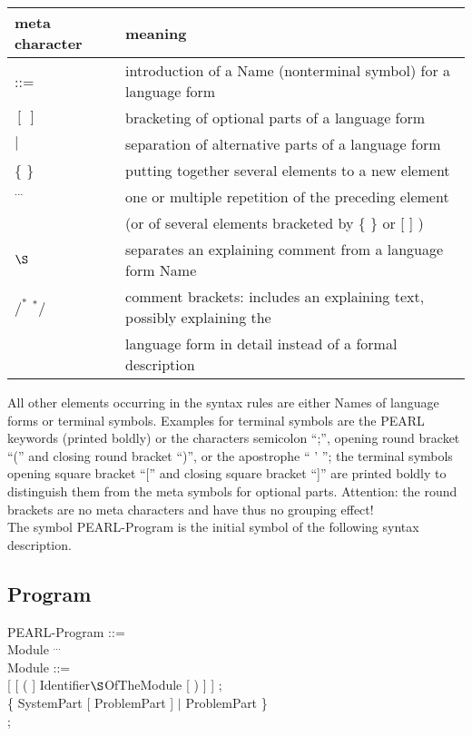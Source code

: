\begin{tabular}{ll}
meta character & meaning \\ \hline
::=            & introduction of a Name (nonterminal symbol) for a language form\\
$[\ ]$         & bracketing of optional parts of a language form \\ 
$\mid$         & separation of alternative parts of a language form\\
\{ \}          & putting together several elements to a new element\\
$^{...}$       & one or multiple repetition of the preceding element\\
               & (or of several elements bracketed by \{ \} or [ ] ) \\
$\S $          & separates an explaining comment from a language form Name\\
$/^*$ $^*/$    & comment brackets: 
                 includes an explaining text, possibly explaining the\\
               & language form in detail instead of a formal description\\
\end{tabular}

All other elements occurring in the syntax rules are either Names of language
forms or terminal symbols. Examples for terminal symbols are the PEARL
keywords (printed boldly) or the characters semicolon ``;'', opening round
bracket ``('' and closing round bracket ``)'', 
or the apostrophe `` ' ''; the terminal symbols opening square bracket ``[''
and closing square bracket ``]'' are printed boldly to distinguish them
from the meta symbols for optional parts. Attention: the round brackets are
no meta characters and have thus no grouping effect!\\

The symbol PEARL-Program is the initial symbol of the following syntax
description.

\subsection{Program}    %

PEARL-Program ::=\\
\x Module $^{...}$\\

Module ::=\\
 [ [ ( ] Identifier$\S $OfTheModule [ ) ] ] ;\\
\x \{ SystemPart [ ProblemPart ] $\mid$ ProblemPart \} \\
 ;

